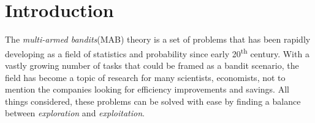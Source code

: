 \documentclass[12pt, a4paper, pdflatex, leqno, twoside]{report}
\newcommand{\ts}{\textsuperscript}
\begin{document}
\newpage
\thispagestyle{empty}
\mbox{}

\newpage
{
\thispagestyle{empty}
\cleardoublepage
\pagestyle{plain}


\tableofcontents
\thispagestyle{empty}

}
\newpage
\thispagestyle{empty}
\mbox{}



\chapter{Introduction\label{chap:intro}}
\setcounter{page}{1}
The \emph{multi-armed bandits}(MAB) theory is a set of problems that has been rapidly developing as a field of 
statistics and probability since early 20\ts{th} century. With a vastly 
growing number of tasks that could be framed as a bandit scenario, the field has 
become a topic of research for many scientists, economists, not to mention 
the companies looking for efficiency improvements and savings. All things 
considered, these problems can be solved with ease by finding a balance between 
\emph{exploration} and \emph{exploitation}.\\






\end{document}
